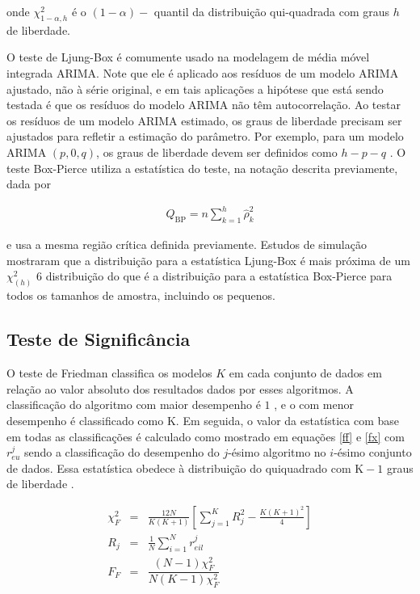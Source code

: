 \noindent onde $\chi_{1-\alpha, h}^2$ é o $(1-\alpha)-$ quantil \cite{Brockwell2002} da distribuição qui-quadrada com graus $h$ de liberdade.
 
O teste de Ljung-Box é comumente usado na modelagem de média móvel integrada ARIMA. Note que ele é aplicado aos resíduos de um modelo ARIMA ajustado, não à série original, e em tais aplicações a hipótese que está sendo testada é que os resíduos do modelo ARIMA não têm autocorrelação. Ao testar os resíduos de um modelo ARIMA estimado, os graus de liberdade precisam ser ajustados para refletir a estimação do parâmetro. Por exemplo, para um modelo ARIMA $(p,0,q)$, os graus de liberdade devem ser definidos como $h-p-q$ \cite{Davidson2000}. O teste Box-Pierce utiliza a estatística do teste, na notação descrita previamente, dada por \cite{box}
 
 \begin{eqnarray}
 	Q_{\mathrm{BP}}=n \sum_{k=1}^h \hat{\rho}_k^2
 \end{eqnarray}
 
\noindent e usa a mesma região crítica definida previamente.
Estudos de simulação mostraram que a distribuição para a estatística Ljung-Box é mais próxima de um $\chi^2_{(h)}$ 6 distribuição do que é a distribuição para a estatística Box-Pierce para todos os tamanhos de amostra, incluindo os pequenos.
 
 
\subsection{Teste de Signific\^ancia}
 
O teste de Friedman classifica os modelos $K$ em cada conjunto de dados em relação ao valor absoluto dos resultados dados por esses algoritmos. A classificação do algoritmo com maior desempenho é $1$ , e o com menor desempenho é classificado como $\mathrm{K}$. Em seguida, o valor da estatística com base em todas as classificações é calculado como mostrado em equações \eqref{ff} e \eqref{fx} com $r_{e u}^j$ sendo a classificação do desempenho do $j$-ésimo algoritmo no $i$-ésimo conjunto de dados. Essa estatística obedece à distribuição do quiquadrado com $\mathrm{K}-1$ graus de liberdade \cite{Liu2022}.
 
 \begin{eqnarray}
 	\chi_F^2 & =&\frac{12 N}{K(K+1)}\left[\sum_{j=1}^K R_j^2-\frac{K(K+1)^2}{4}\right] \label{ff}\\
 	R_j & =&\frac{1}{N} \sum_{i=1}^N r_{e i l}^j \label{fx}\\
 	F_F&=&\dfrac{(N-1) \chi_F^2}{N(K-1) \chi_F^2}\label{fx1}
 \end{eqnarray}
 
